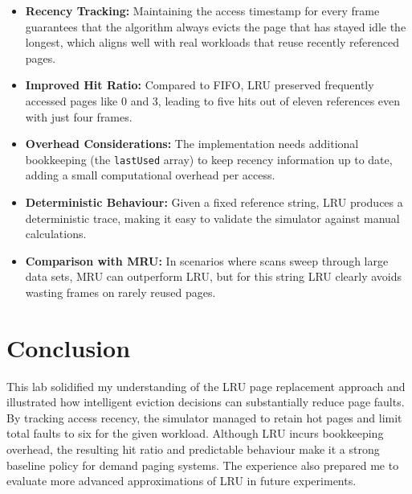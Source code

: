 \documentclass[12pt,a4paper]{article}
\begin{document}
\begin{itemize}
		\item \textbf{Recency Tracking:} Maintaining the access timestamp for every frame guarantees that the algorithm always evicts the page that has stayed idle the longest, which aligns well with real workloads that reuse recently referenced pages.
		\item \textbf{Improved Hit Ratio:} Compared to FIFO, LRU preserved frequently accessed pages like 0 and 3, leading to five hits out of eleven references even with just four frames.
		\item \textbf{Overhead Considerations:} The implementation needs additional bookkeeping (the \texttt{lastUsed} array) to keep recency information up to date, adding a small computational overhead per access.
		\item \textbf{Deterministic Behaviour:} Given a fixed reference string, LRU produces a deterministic trace, making it easy to validate the simulator against manual calculations.
		\item \textbf{Comparison with MRU:} In scenarios where scans sweep through large data sets, MRU can outperform LRU, but for this string LRU clearly avoids wasting frames on rarely reused pages.
\end{itemize}

\section{Conclusion}
This lab solidified my understanding of the LRU page replacement approach and illustrated how intelligent eviction decisions can substantially reduce page faults. By tracking access recency, the simulator managed to retain hot pages and limit total faults to six for the given workload. Although LRU incurs bookkeeping overhead, the resulting hit ratio and predictable behaviour make it a strong baseline policy for demand paging systems. The experience also prepared me to evaluate more advanced approximations of LRU in future experiments.
\end{document}
